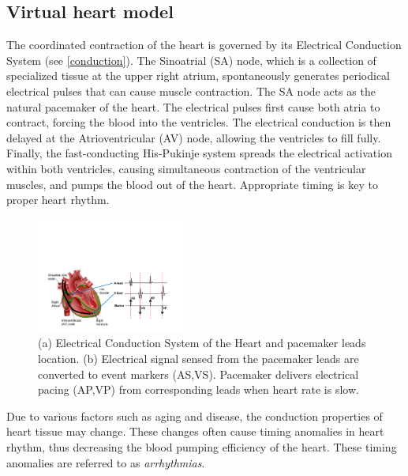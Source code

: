 \subsection{Virtual heart model}
\label{heartmodel}

The coordinated contraction of the heart is governed by its Electrical Conduction System (see \ref{conduction}). The Sinoatrial (SA) node, which is a collection of specialized tissue at the upper right atrium, spontaneously generates periodical electrical pulses that can cause muscle contraction. 
The SA node acts as the natural pacemaker of the heart. 
The electrical pulses first cause both atria to contract, forcing the blood into the ventricles. 
The electrical conduction is then delayed at the Atrioventricular (AV) node, allowing the ventricles to fill fully. Finally, the fast-conducting His-Pukinje system spreads the electrical activation within both ventricles, causing simultaneous contraction of the ventricular muscles, and pumps the blood out of the heart. 
Appropriate timing is key to proper heart rhythm.

\begin{figure}
	\begin{center}
		\includegraphics[width=0.45\textwidth]{figures/egm.pdf}
	\end{center}
	\caption{\small (a) Electrical Conduction System of the Heart and pacemaker leads location. (b) Electrical signal sensed from the pacemaker leads are converted to event markers (AS,VS). Pacemaker delivers electrical pacing (AP,VP) from corresponding leads when heart rate is slow.}
	\label{fig:conduction}
\end{figure}

Due to various factors such as aging and disease, the conduction properties of heart tissue may change. 
These changes often cause timing anomalies in heart rhythm, thus decreasing the blood pumping efficiency of the heart. These timing anomalies are referred to as \emph{arrhythmias}.  
